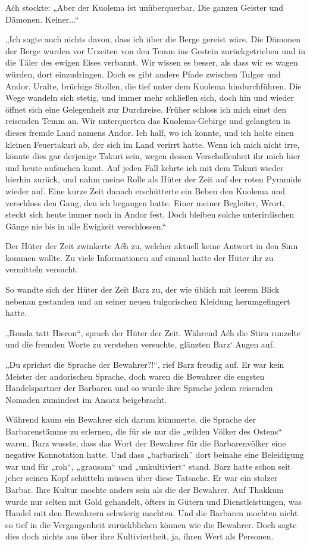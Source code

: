 Aćh stockte: „Aber der Kuolema ist unüberquerbar. Die ganzen Geister und Dämonen. Keiner...“

„Ich sagte auch nichts davon, dass ich über die Berge gereist wäre. Die Dämonen der Berge wurden vor Urzeiten von den Temm ins Gestein zurückgetrieben und in die Täler des ewigen Eises verbannt. Wir wissen es besser, als dass wir es wagen würden, dort einzudringen. Doch es gibt andere Pfade zwischen Tulgor und Andor. Uralte, brüchige Stollen, die tief unter dem Kuolema hindurchführen. Die Wege wandeln sich stetig, und immer mehr schließen sich, doch hin und wieder öffnet sich eine Gelegenheit zur Durchreise. Früher schloss ich mich einst den reisenden Temm an. Wir unterquerten das Kuolema-Gebirge und gelangten in dieses fremde Land namens Andor. Ich half, wo ich konnte, und ich holte einen kleinen Feuertakuri ab, der sich im Land verirrt hatte. Wenn ich mich nicht irre, könnte dies gar derjenige Takuri sein, wegen dessen Verschollenheit ihr mich hier und heute aufsuchen kamt. Auf jeden Fall kehrte ich mit dem Takuri wieder hierhin zurück, und nahm meine Rolle als Hüter der Zeit auf der roten Pyramide wieder auf. Eine kurze Zeit danach erschütterte ein Beben den Kuolema und verschloss den Gang, den ich begangen hatte. Einer meiner Begleiter, Wrort, steckt sich heute immer noch in Andor fest. Doch bleiben solche unterirdischen Gänge nie bis in alle Ewigkeit verschlossen.“

Der Hüter der Zeit zwinkerte Aćh zu, welcher aktuell keine Antwort in den Sinn kommen wollte. Zu viele Informationen auf einmal hatte der Hüter ihr zu vermitteln versucht.

So wandte sich der Hüter der Zeit Barz zu, der wie üblich mit leerem Blick nebenan gestanden und an seiner neuen tulgorischen Kleidung herumgefingert hatte.

„Ronda tatt Hieron“, sprach der Hüter der Zeit. Während Aćh die Stirn runzelte und die fremden Worte zu verstehen versuchte, glänzten Barz‘ Augen auf.



\trennzeichen



„Du sprichst die Sprache der Bewahrer?!“, rief Barz freudig auf. Er war kein Meister der andorischen Sprache, doch waren die Bewahrer die engsten Handelspartner der Barbaren und so wurde ihre Sprache jedem reisenden Nomaden zumindest im Ansatz beigebracht.

Während kaum ein Bewahrer sich darum kümmerte, die Sprache der Barbarenstämme zu erlernen, die für sie nur die „wilden Völker des Ostens“ waren. Barz wusste, dass das Wort der Bewahrer für die Barbarenvölker eine negative Konnotation hatte. Und dass „barbarisch” dort beinahe eine Beleidigung war und für „roh“, „grausam“ und „unkultiviert“ stand. Barz hatte schon seit jeher seinen Kopf schütteln müssen über diese Tatsache. Er war ein stolzer Barbar. Ihre Kultur mochte anders sein als die der Bewahrer. Auf Thakkum wurde nur selten mit Gold gehandelt, öfters in Gütern und Dienstleistungen, was Handel mit den Bewahrern schwierig machten. Und die Barbaren mochten nicht so tief in die Vergangenheit zurückblicken können wie die Bewahrer. Doch sagte dies doch nichts aus über ihre Kultiviertheit, ja, ihren Wert als Personen.

